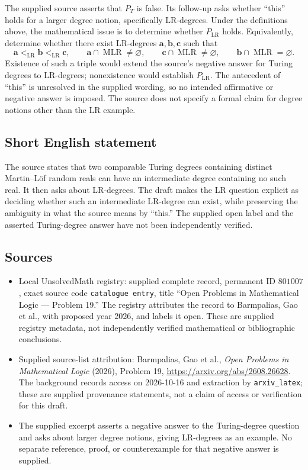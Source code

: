 \documentclass[11pt]{article}
\begin{document}
The supplied source asserts that $P_T$ is false. Its follow-up asks whether ``this'' holds for a larger degree notion, specifically LR-degrees. Under the definitions above, the mathematical issue is to determine whether $P_{\mathrm{LR}}$ holds. Equivalently, determine whether there exist LR-degrees $\mathbf a,\mathbf b,\mathbf c$ such that
\[
\mathbf a<_{\mathrm{LR}}\mathbf b<_{\mathrm{LR}}\mathbf c,
\qquad
\mathbf a\cap\operatorname{MLR}\ne\varnothing,
\qquad
\mathbf c\cap\operatorname{MLR}\ne\varnothing,
\qquad
\mathbf b\cap\operatorname{MLR}=\varnothing.
\]
Existence of such a triple would extend the source's negative answer for Turing degrees to LR-degrees; nonexistence would establish $P_{\mathrm{LR}}$. The antecedent of ``this'' is unresolved in the supplied wording, so no intended affirmative or negative answer is imposed. The source does not specify a formal claim for degree notions other than the LR example.
\subsection{Short English statement}
The source states that two comparable Turing degrees containing distinct Martin--L\"of random reals can have an intermediate degree containing no such real. It then asks about LR-degrees. The draft makes the LR question explicit as deciding whether such an intermediate LR-degree can exist, while preserving the ambiguity in what the source means by ``this.'' The supplied open label and the asserted Turing-degree answer have not been independently verified.
\subsection{Sources}
\begin{itemize}
\item Local UnsolvedMath registry: supplied complete record, permanent ID \(801007\), exact source code \texttt{catalogue entry}, title ``Open Problems in Mathematical Logic --- Problem 19.'' The registry attributes the record to Barmpalias, Gao et al., with proposed year 2026, and labels it open. These are supplied registry metadata, not independently verified mathematical or bibliographic conclusions.
\item Supplied source-list attribution: Barmpalias, Gao et al., \emph{Open Problems in Mathematical Logic} (2026), Problem 19, \url{https://arxiv.org/abs/2608.26628}. The background records access on 2026-10-16 and extraction by \texttt{arxiv\_latex}; these are supplied provenance statements, not a claim of access or verification for this draft.
\item The supplied excerpt asserts a negative answer to the Turing-degree question and asks about larger degree notions, giving LR-degrees as an example. No separate reference, proof, or counterexample for that negative answer is supplied.
\end{itemize}
\end{document}
